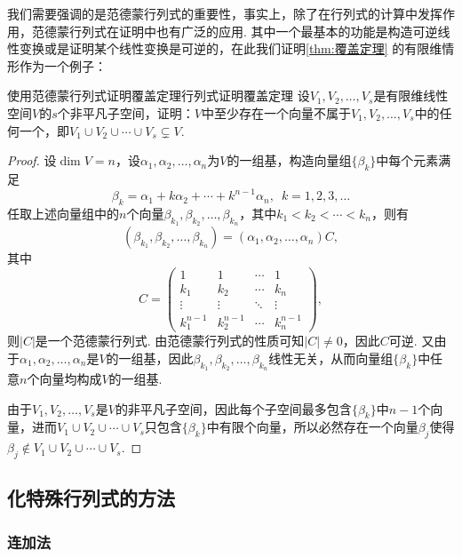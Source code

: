 我们需要强调的是范德蒙行列式的重要性，事实上，除了在行列式的计算中发挥作用，范德蒙行列式在证明中也有广泛的应用. 其中一个最基本的功能是构造可逆线性变换或是证明某个线性变换是可逆的，在此我们证明\autoref{thm:覆盖定理} 的有限维情形作为一个例子：

\begin{example}{使用范德蒙行列式证明覆盖定理}{行列式证明覆盖定理}
    设$V_1,V_2,\ldots,V_s$是有限维线性空间$V$的$s$个非平凡子空间，证明：$V$中至少存在一个向量不属于$V_1,V_2,\ldots,V_s$中的任何一个，即$V_1 \cup V_2 \cup \cdots \cup V_s\subsetneq V$.
\end{example}

\begin{proof}
    设$\dim V=n$，设$\alpha_1,\alpha_2,\ldots,\alpha_n$为$V$的一组基，构造向量组$\{\beta_k\}$中每个元素满足
    \[\beta_k=\alpha_1+k\alpha_2+\cdots+k^{n-1}\alpha_n,\enspace k=1,2,3,\ldots\]
    任取上述向量组中的$n$个向量$\beta_{k_1},\beta_{k_2},\ldots,\beta_{k_n}$，其中$k_1<k_2<\cdots<k_n$，则有
    \[(\beta_{k_1},\beta_{k_2},\ldots,\beta_{k_n})=(\alpha_1,\alpha_2,\ldots,\alpha_n)C,\]
    其中
    \[C=\begin{pmatrix}
            1         & 1         & \cdots & 1         \\
            k_1       & k_2       & \cdots & k_n       \\
            \vdots    & \vdots    & \ddots & \vdots    \\
            k_1^{n-1} & k_2^{n-1} & \cdots & k_n^{n-1}
        \end{pmatrix},\]
    则$|C|$是一个范德蒙行列式. 由范德蒙行列式的性质可知$|C| \neq 0$，因此$C$可逆. 又由于$\alpha_1,\alpha_2,\ldots,\alpha_n$是$V$的一组基，因此$\beta_{k_1},\beta_{k_2},\ldots,\beta_{k_n}$线性无关，从而向量组$\{\beta_k\}$中任意$n$个向量均构成$V$的一组基.

    由于$V_1,V_2,\ldots,V_s$是$V$的非平凡子空间，因此每个子空间最多包含$\{\beta_k\}$中$n-1$个向量，进而$V_1\cup V_2\cup\cdots\cup V_s$只包含$\{\beta_k\}$中有限个向量，所以必然存在一个向量$\beta_j$使得$\beta_j \notin V_1\cup V_2\cup\cdots\cup V_s$.
\end{proof}

\subsection{化特殊行列式的方法}

\subsubsection{连加法}

